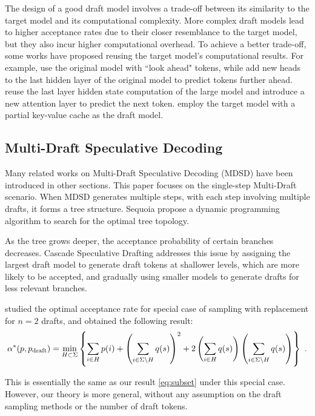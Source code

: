 \documentclass{article}
\begin{document}
The design of a good draft model involves a trade-off between its similarity to the target model and its computational complexity. More complex draft models lead to higher acceptance rates due to their closer resemblance to the target model, but they also incur higher computational overhead. To achieve a better trade-off, some works have proposed reusing the target model's computational results. For example, \citet{monea2023pass} use the original model with ``look ahead" tokens, while \citet{cai2024medusa} add new heads to the last hidden layer of the original model to predict tokens further ahead. \citet{li2024eagle} reuse the last layer hidden state computation of the large model and introduce a new attention layer to predict the next token. \citet{sun2024triforce} employ the target model with a partial key-value cache as the draft model.


\subsection{Multi-Draft Speculative Decoding}\label{sec:related_mdsd}
Many related works on Multi-Draft Speculative Decoding (MDSD) have been introduced in other sections. This paper focuses on the single-step Multi-Draft scenario. When MDSD generates multiple steps, with each step involving multiple drafts, it forms a tree structure. Sequoia \citep{chen2024sequoia} propose a dynamic programming algorithm to search for the optimal tree topology.

As the tree grows deeper, the acceptance probability of certain branches decreases. Cascade Speculative Drafting \citep{chen2023cascade} addresses this issue by assigning the largest draft model to generate draft tokens at shallower levels, which are more likely to be accepted, and gradually using smaller models to generate drafts for less relevant branches.

\citet{khisti2024importanceweighted} studied the optimal acceptance rate for special case of sampling with replacement for $n=2$ drafts, and obtained the following result:
\begin{equation}
\alpha^\ast(p,p_{\operatorname{draft}}) = \min_{H \subset\Sigma} \left\{
\sum_{i\in H} p(i)+\left(\sum_{i\in \Sigma\setminus H} q(s)\right)^2+2\left(\sum_{i\in H} q(s)\right)\left(\sum_{i\in \Sigma\setminus H} q(s)\right)
\right\}
~.
\end{equation}

This is essentially the same as our result \eqref{eq:subset} under this special case. 
However, our theory is more general, without any assumption on the draft sampling methods or the number of draft tokens.
\end{document}
